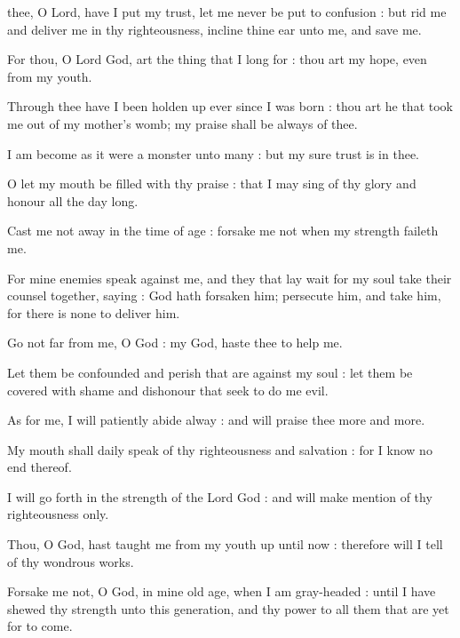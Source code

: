  thee, O Lord, have I put my trust, let me never be put to confusion : but rid me and deliver me in thy righteousness, incline thine ear unto me, and save me.\par
{}
For thou, O Lord God, art the thing that I long for : thou art my hope, even from my youth.\par
{}Through thee have I been holden up ever since I was born : thou art he that took me out of my mother's womb; my praise shall be always of thee.\par
{}I am become as it were a monster unto many : but my sure trust is in thee.\par
{}O let my mouth be filled with thy praise : that I may sing of thy glory and honour all the day long.\par
{}Cast me not away in the time of age : forsake me not when my strength faileth me.\par
{}For mine enemies speak against me, and they that lay wait for my soul take their counsel together, saying : God hath forsaken him; persecute him, and take him, for there is none to deliver him.\par
{}Go not far from me, O God : my God, haste thee to help me.\par
{}Let them be confounded and perish that are against my soul : let them be covered with shame and dishonour that seek to do me evil.\par
{}As for me, I will patiently abide alway : and will praise thee more and more.\par
{}My mouth shall daily speak of thy righteousness and salvation : for I know no end thereof.\par
{}I will go forth in the strength of the Lord God : and will make mention of thy righteousness only.\par
{}Thou, O God, hast taught me from my youth up until now : therefore will I tell of thy wondrous works.\par
{}Forsake me not, O God, in mine old age, when I am gray-headed : until I have shewed thy strength unto this generation, and thy power to all them that are yet for to come.\par
